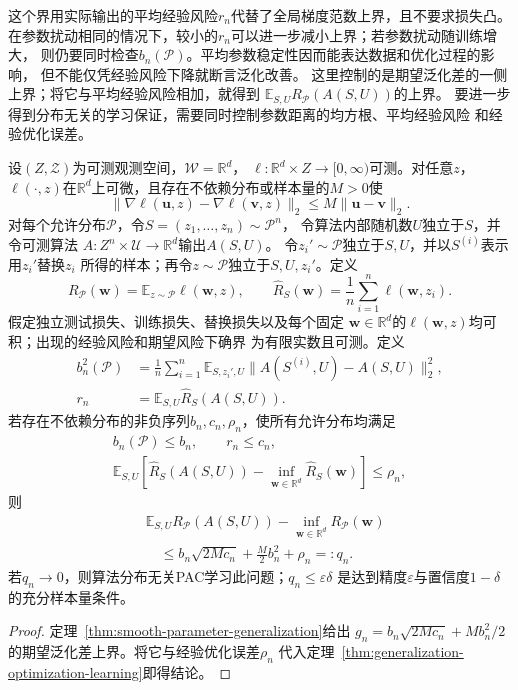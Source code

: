 这个界用实际输出的平均经验风险$r_n$代替了全局梯度范数上界，且不要求损失凸。
在参数扰动相同的情况下，较小的$r_n$可以进一步减小上界；若参数扰动随训练增大，
则仍要同时检查$b_n(\mathcal P)$。平均参数稳定性因而能表达数据和优化过程的影响，
但不能仅凭经验风险下降就断言泛化改善。
这里控制的是期望泛化差的一侧上界；将它与平均经验风险相加，就得到
$\mathbb E_{S,U}R_{\mathcal P}(A(S,U))$的上界。
要进一步得到分布无关的学习保证，需要同时控制参数距离的均方根、平均经验风险
和经验优化误差。

\begin{theorem}[光滑损失下参数稳定性与可学习性]
\label{thm:smooth-parameter-learning}
设$(Z,\mathcal Z)$为可测观测空间，$\mathcal W=\mathbb R^d$，
$\ell:\mathbb R^d\times Z\to[0,\infty)$可测。对任意$z$，
$\ell(\cdot,z)$在$\mathbb R^d$上可微，且存在不依赖分布或样本量的$M>0$使
\[
 \|\nabla\ell(\bm u,z)-\nabla\ell(\bm v,z)\|_2
 \leq M\|\bm u-\bm v\|_2.
\]
对每个允许分布$\mathcal P$，令$S=(z_1,\ldots,z_n)\sim\mathcal P^n$，
令算法内部随机数$U$独立于$S$，并令可测算法
$A:Z^n\times\mathcal U\to\mathbb R^d$输出$A(S,U)$。
令$z_i'\sim\mathcal P$独立于$S,U$，并以$S^{(i)}$表示用$z_i'$替换$z_i$
所得的样本；再令$z\sim\mathcal P$独立于$S,U,z_i'$。定义
\[
 R_{\mathcal P}(\bm w)=\mathbb E_{z\sim\mathcal P}\ell(\bm w,z),
 \qquad
 \hat R_S(\bm w)=\frac1n\sum_{i=1}^n\ell(\bm w,z_i).
\]
假定独立测试损失、训练损失、替换损失以及每个固定
$\bm w\in\mathbb R^d$的$\ell(\bm w,z)$均可积；出现的经验风险和期望风险下确界
为有限实数且可测。定义
\[
\begin{aligned}
 b_n^2(\mathcal P)
 &=\frac1n\sum_{i=1}^n\mathbb E_{S,z_i',U}
   \|A(S^{(i)},U)-A(S,U)\|_2^2,\\
 r_n&=\mathbb E_{S,U}\hat R_S(A(S,U)).
\end{aligned}
\]
若存在不依赖分布的非负序列$b_n,c_n,\rho_n$，使所有允许分布均满足
\begin{gather*}
 b_n(\mathcal P)\leq b_n,\qquad r_n\leq c_n,\\
 \mathbb E_{S,U}[\hat R_S(A(S,U))-\inf_{\bm w\in\mathbb R^d}
 \hat R_S(\bm w)]\leq\rho_n,
\end{gather*}
则
\begin{align*}
 &\mathbb E_{S,U}R_{\mathcal P}(A(S,U))
 -\inf_{\bm w\in\mathbb R^d}R_{\mathcal P}(\bm w)\\
 &\quad\leq b_n\sqrt{2Mc_n}+\frac M2b_n^2+\rho_n=:q_n.
\end{align*}
若$q_n\to0$，则算法分布无关PAC学习此问题；$q_n\leq\varepsilon\delta$
是达到精度$\varepsilon$与置信度$1-\delta$的充分样本量条件。
\end{theorem}
\begin{proof}
定理~\ref{thm:smooth-parameter-generalization}给出
$g_n=b_n\sqrt{2Mc_n}+Mb_n^2/2$的期望泛化差上界。将它与经验优化误差$\rho_n$
代入定理~\ref{thm:generalization-optimization-learning}即得结论。
\end{proof}

